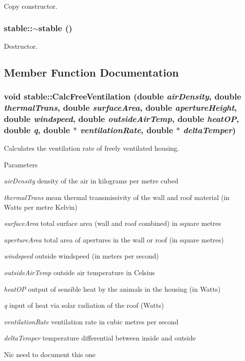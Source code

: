 Copy constructor. \hypertarget{classstable_a56a41cc73948359a0a3ef1c77cef9c82}{
\subsubsection[{$\sim$stable}]{\setlength{\rightskip}{0pt plus 5cm}stable::$\sim$stable ()}}
\label{classstable_a56a41cc73948359a0a3ef1c77cef9c82}


Destructor. 

\subsection{Member Function Documentation}
\hypertarget{classstable_a78d6cd91aa176da41ea04afc90dfc17b}{
\subsubsection[{CalcFreeVentilation}]{\setlength{\rightskip}{0pt plus 5cm}void stable::CalcFreeVentilation (double {\em airDensity}, \/  double {\em thermalTrans}, \/  double {\em surfaceArea}, \/  double {\em apertureHeight}, \/  double {\em windspeed}, \/  double {\em outsideAirTemp}, \/  double {\em heatOP}, \/  double {\em q}, \/  double $\ast$ {\em ventilationRate}, \/  double $\ast$ {\em deltaTemper})}}
\label{classstable_a78d6cd91aa176da41ea04afc90dfc17b}


Calculates the ventilation rate of freely ventilated housing. 
\begin{DoxyParams}{Parameters}
\item[{\em airDensity}]density of the air in kilograms per metre cubed \item[{\em thermalTrans}]mean thermal transmissivity of the wall and roof material (in Watts per metre Kelvin) \item[{\em surfaceArea}]total surface area (wall and roof combined) in square metres \item[{\em apertureArea}]total area of apertures in the wall or roof (in square metres) \item[{\em windspeed}]outside windspeed (in meters per second) \item[{\em outsideAirTemp}]outside air temperature in Celsius \item[{\em heatOP}]output of sensible heat by the animals in the housing (in Watts) \item[{\em q}]input of heat via solar radiation of the roof (Watts) \item[{\em ventilationRate}]ventilation rate in cubic metres per second \item[{\em deltaTemper}]temperature differential between inside and outside\end{DoxyParams}
Nic need to document this one 

